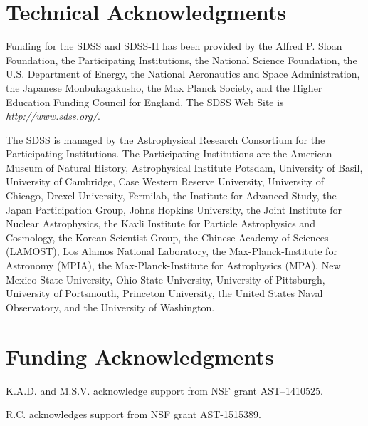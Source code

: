 \chapter*{Technical Acknowledgments}


Funding for the SDSS and SDSS-II has been provided by the Alfred P. Sloan 
Foundation, the Participating Institutions, the National Science Foundation, the 
U.S. Department of Energy, the National Aeronautics and Space Administration, 
the Japanese Monbukagakusho, the Max Planck Society, and the Higher Education 
Funding Council for England.  The SDSS Web Site is \emph{http://www.sdss.org/}.

The SDSS is managed by the Astrophysical Research Consortium for the 
Participating Institutions.  The Participating Institutions are the American 
Museum of Natural History, Astrophysical Institute Potsdam, University of Basil, 
University of Cambridge, Case Western Reserve University, University of Chicago, 
Drexel University, Fermilab, the Institute for Advanced Study, the Japan 
Participation Group, Johns Hopkins University, the Joint Institute for Nuclear 
Astrophysics, the Kavli Institute for Particle Astrophysics and Cosmology, the 
Korean Scientist Group, the Chinese Academy of Sciences (LAMOST), Los Alamos 
National Laboratory, the Max-Planck-Institute for Astronomy (MPIA), the 
Max-Planck-Institute for Astrophysics (MPA), New Mexico State University, Ohio 
State University, University of Pittsburgh, University of Portsmouth, Princeton 
University, the United States Naval Observatory, and the University of 
Washington.


\vspace{1in}


{\let\clearpage\relax \chapter*{Funding Acknowledgments}}

\noindent
K.A.D. and M.S.V. acknowledge support from NSF grant AST--1410525.

\noindent
R.C. acknowledges support from NSF grant AST-1515389.